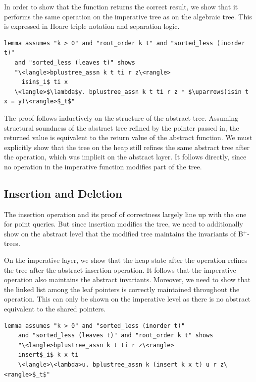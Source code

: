 \documentclass[runningheads]{llncs}
\newcommand{\btrees}{B$^+$-trees}
\begin{document}
In order to show that the function returns the correct result,
we show that it performs the same operation on the imperative tree
as on the algebraic tree.
This is expressed in Hoare triple notation and separation logic.

\begin{lstlisting}[mathescape=true, language=Isabelle,label=lst:isin-refines]
lemma assumes "k > 0" and "root_order k t" and "sorted_less (inorder t)"
   and "sorted_less (leaves t)" shows
   "\<langle>bplustree_assn k t ti r z\<rangle>
     isin$_i$ ti x
   \<langle>$\lambda$y. bplustree_assn k t ti r z * $\uparrow$(isin t x = y)\<rangle>$_t$"
\end{lstlisting}

The proof follows inductively on the structure of the abstract tree.
Assuming structural soundness of the abstract tree refined by the pointer passed in,
the returned value is equivalent to the return value of the abstract function.
We must explicitly show that the tree on the heap
still refines the same abstract tree after the operation,
which was implicit on the abstract layer.
It follows directly, since no operation in the imperative
function modifies part of the tree.

\subsection{Insertion and Deletion}
\label{sec:insert_delete}

The insertion operation and its proof of correctness largely line up with the one for point queries.
But since insertion modifies the tree,
we need to additionally show on the abstract level that the modified tree
maintains the invariants of \btrees.

On the imperative layer, we show that the heap state
after the operation refines the tree
after the abstract insertion operation.
It follows that the imperative operation
also maintains the abstract invariants.
Moreover, we need to show that the linked list 
among the leaf pointers is correctly maintained throughout the operation.
This can only be shown on the imperative level as there is no abstract equivalent
to the shared pointers.

\begin{lstlisting}[mathescape=true, language=Isabelle,label=lst:insert-refines]
lemma assumes "k > 0" and "sorted_less (inorder t)"
    and "sorted_less (leaves t)" and "root_order k t" shows
    "\<langle>bplustree_assn k t ti r z\<rangle>
    insert$_i$ k x ti
    \<langle>\<lambda>u. bplustree_assn k (insert k x t) u r z\<rangle>$_t$"
\end{lstlisting}
  
\end{document}

